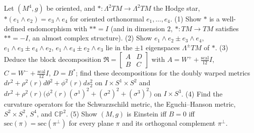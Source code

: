 \begin{remark}
  \label{rem:pet-ch4-ex-28}

  Let $(M^4,g)$ be oriented, and $*:\Lambda^2TM\to\Lambda^2TM$ the Hodge star,
  $*(e_1\wedge e_2)=e_3\wedge e_4$ for oriented orthonormal $e_1,\dots,e_4$. (1)
  Show $*$ is a well-defined endomorphism with $**=I$ (and in dimension $2$,
  $*:TM\to TM$ satisfies $**=-I$, an almost complex structure). (2) Show
  $e_1\wedge e_2\pm e_3\wedge e_4$, $e_1\wedge e_3\pm e_4\wedge e_2$,
  $e_1\wedge e_4\pm e_2\wedge e_3$ lie in the $\pm1$ eigenspaces
  $\Lambda^\pm TM$ of $*$. (3) Deduce the block decomposition
  $\mathfrak R=\left[\begin{smallmatrix}A&D\\B&C\end{smallmatrix}\right]$ with
  $A=W^++\tfrac{\mathrm{scal}}{12}I$, $C=W^-+\tfrac{\mathrm{scal}}{12}I$,
  $D=B^*$; find these decompositions for the doubly warped metrics
  $dr^2+\rho^2(r)d\theta^2+\phi^2(r)ds_2^2$ on $I\times S^1\times S^2$ and
  $dr^2+\rho^2(r)\big(\phi^2(r)(\sigma^1)^2+(\sigma^2)^2+(\sigma^3)^2\big)$ on
  $I\times S^3$. (4) Find the curvature operators for the Schwarzschild
  metric, the Eguchi--Hanson metric, $S^2\times S^2$, $S^4$, and $\mathbb{CP}^2$.
  (5) Show $(M,g)$ is Einstein iff $B=0$ iff $\mathrm{sec}(\pi)=\mathrm{sec}(\pi^\perp)$
  for every plane $\pi$ and its orthogonal complement $\pi^\perp$.
\end{remark}
